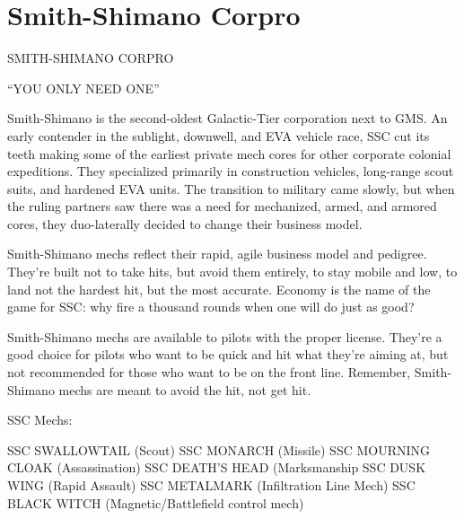 \chapter{Smith-Shimano Corpro}

 SMITH-SHIMANO CORPRO   

                                        “YOU ONLY NEED ONE”  

Smith-Shimano is the second-oldest Galactic-Tier corporation next to GMS. An early  
contender in the sublight, downwell, and EVA vehicle race, SSC cut its teeth making some of the  
earliest private mech cores for other corporate colonial expeditions. They specialized primarily in  
construction vehicles, long-range scout suits, and hardened EVA units. The transition to military  
came slowly, but when the ruling partners saw there was a need for mechanized, armed, and  
armored cores, they duo-laterally decided to change their business model.
 

Smith-Shimano mechs reflect their rapid, agile business model and pedigree. They’re built not to  
take hits, but avoid them entirely, to stay mobile and low, to land not the hardest hit, but the most  
accurate. Economy is the name of the game for SSC: why fire a thousand rounds when one will  
do just as good?
 

Smith-Shimano mechs are available to pilots with the proper license. They’re a good choice for  
pilots who want to be quick and hit what they’re aiming at, but not recommended for those who  
want to be on the front line. Remember, Smith-Shimano mechs are meant to avoid the hit, not  
get hit.  
 

SSC Mechs:
 

SSC SWALLOWTAIL (Scout)  
SSC MONARCH (Missile)  
SSC MOURNING CLOAK (Assassination)  
SSC DEATH’S HEAD (Marksmanship  
SSC DUSK WING (Rapid Assault)  
SSC METALMARK (Infiltration Line Mech)  
SSC BLACK WITCH (Magnetic/Battlefield control mech)  

 
                                                                                                         
 
                                                                                                                         








